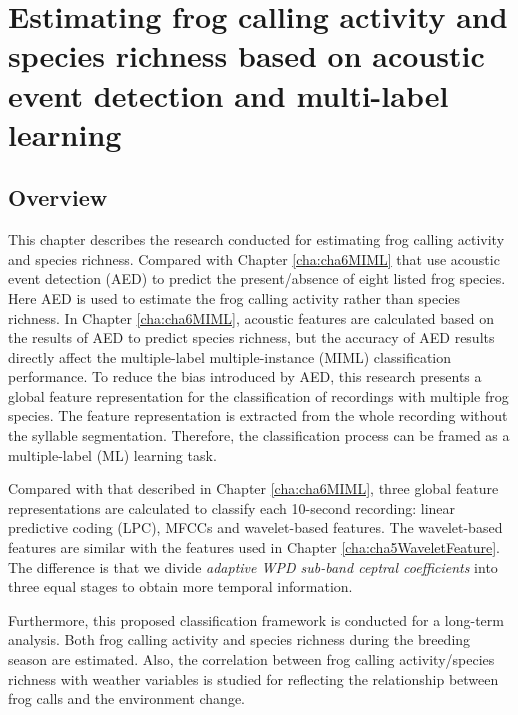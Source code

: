 
\chapter{Estimating frog calling activity and species richness based on acoustic event detection and multi-label learning}
\label{cha:cha7ML}


\section{Overview}
\label{sect:introduction}

This chapter describes the research conducted for estimating frog calling activity and species richness. Compared with Chapter \ref{cha:cha6MIML} that use acoustic event detection (AED) to predict the present/absence of eight listed frog species. Here AED is used to estimate the frog calling activity rather than species richness.
In Chapter \ref{cha:cha6MIML}, acoustic features are calculated based on the results of AED to predict species richness, but the accuracy of AED results directly affect the multiple-label multiple-instance (MIML) classification performance.
To reduce the bias introduced by AED, this research presents a global feature representation for the classification of recordings with multiple frog species. The feature representation is extracted from the whole recording without the syllable segmentation. Therefore, the classification process can be framed as a multiple-label (ML) learning task.  



Compared with that described in Chapter \ref{cha:cha6MIML}, three global feature representations are calculated to classify each 10-second recording: linear predictive coding (LPC), MFCCs and wavelet-based features. The wavelet-based features are similar with the features used in Chapter \ref{cha:cha5WaveletFeature}. The difference is that we divide \textit{adaptive WPD sub-band ceptral coefficients} into three equal stages to obtain more temporal information.


 
Furthermore, this proposed classification framework is conducted for a long-term analysis. Both frog calling activity and species richness during the breeding season are estimated. Also, the correlation between frog calling activity/species richness with weather variables is studied for reflecting the relationship between frog calls and the environment change. 

